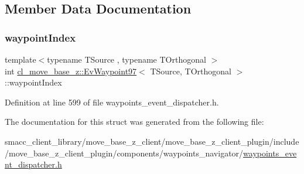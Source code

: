 \subsection{Member Data Documentation}
\mbox{\label{structcl__move__base__z_1_1EvWaypoint97_ae2a955466fb13db1df4cfa79f0df9c5e}} 
\subsubsection{\texorpdfstring{waypoint\+Index}{waypointIndex}}
{\footnotesize\ttfamily template$<$typename T\+Source , typename T\+Orthogonal $>$ \\
int \hyperlink{structcl__move__base__z_1_1EvWaypoint97}{cl\+\_\+move\+\_\+base\+\_\+z\+::\+Ev\+Waypoint97}$<$ T\+Source, T\+Orthogonal $>$\+::waypoint\+Index}



Definition at line 599 of file waypoints\+\_\+event\+\_\+dispatcher.\+h.



The documentation for this struct was generated from the following file\+:\begin{DoxyCompactItemize}
\item 
smacc\+\_\+client\+\_\+library/move\+\_\+base\+\_\+z\+\_\+client/move\+\_\+base\+\_\+z\+\_\+client\+\_\+plugin/include/move\+\_\+base\+\_\+z\+\_\+client\+\_\+plugin/components/waypoints\+\_\+navigator/\hyperlink{waypoints__event__dispatcher_8h}{waypoints\+\_\+event\+\_\+dispatcher.\+h}\end{DoxyCompactItemize}
